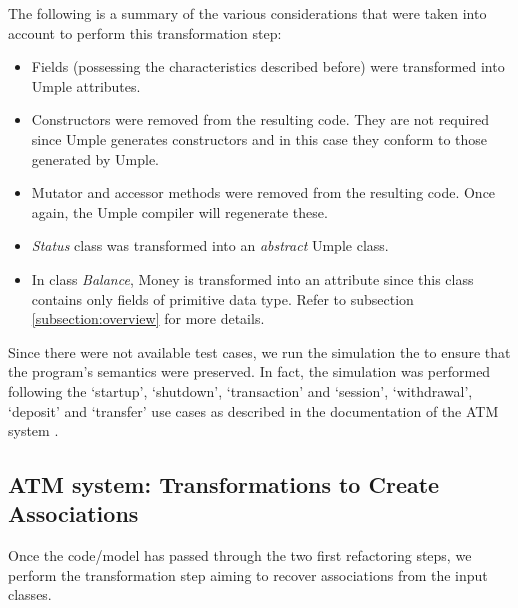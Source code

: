 The following is a summary of the various considerations that were taken into account to perform this transformation step:

\begin{itemize}
\item Fields (possessing the characteristics described before) were transformed into Umple attributes. 

\item Constructors were removed from the resulting code. They are not required since Umple generates constructors and in this case they conform to those generated by Umple. 

\item Mutator and accessor methods were removed from the resulting code. Once again, the Umple compiler will regenerate these. 

\item \textit{Status} class was transformed into an \textit{abstract} Umple class. 

\item In class \textit{Balance}, Money is transformed into an attribute since this class contains only fields of primitive data type. Refer to subsection \ref{subsection:overview} for more details.
\end{itemize}

Since there were not available test cases, we run the simulation the to ensure that the program's semantics were preserved. In fact, the simulation was performed following the  `startup', `shutdown', `transaction' and `session', `withdrawal', `deposit' and `transfer' use cases as described in the documentation of the ATM system \cite{atmsystem}.

\subsection{ATM system: Transformations to Create Associations}

Once the code/model has  passed through the two first refactoring steps, we perform the transformation step aiming to recover associations from the input classes.

